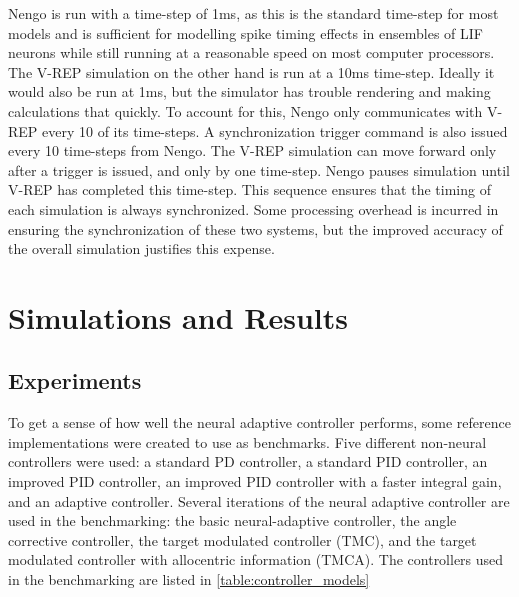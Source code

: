 \documentclass[letterpaper,12pt,titlepage,oneside,final]{book}
\begin{document}
Nengo is run with a time-step of 1ms, as this is the standard time-step for most models and is sufficient for modelling spike timing effects in ensembles of LIF neurons while still running at a reasonable speed on most computer processors. 
The V-REP simulation on the other hand is run at a 10ms time-step. 
Ideally it would also be run at 1ms, but the simulator has trouble rendering and making calculations that quickly. 
To account for this, Nengo only communicates with V-REP every 10 of its time-steps. 
A synchronization trigger command is also issued every 10 time-steps from Nengo. 
The V-REP simulation can move forward only after a trigger is issued, and only by one time-step. 
Nengo pauses simulation until V-REP has completed this time-step. 
This sequence ensures that the timing of each simulation is always synchronized. 
Some processing overhead is incurred in ensuring the synchronization of these two systems, but the improved accuracy of the overall simulation justifies this expense. 

\chapter{Simulations and Results} \label{chap:analysis}

\section{Experiments}


To get a sense of how well the neural adaptive controller performs, some reference implementations were created to use as benchmarks. 
Five different non-neural controllers were used: a standard PD controller, a standard PID controller, an improved PID controller, an improved PID controller with a faster integral gain, and an adaptive controller. 
Several iterations of the neural adaptive controller are used in the benchmarking: the basic neural-adaptive controller, the angle corrective controller, the target modulated controller (TMC), and the target modulated controller with allocentric information (TMCA). %
The controllers used in the benchmarking are listed in \autoref{table:controller_models}
\end{document}
